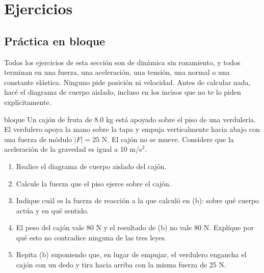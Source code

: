 \documentclass[11pt,openany]{book}
\begin{document}
\section{Ejercicios}

\subsection{Práctica en bloque}

Todos los ejercicios de esta sección son de dinámica sin rozamiento, y todos terminan en una fuerza, una aceleración, una tensión, una normal o una constante elástica. Ninguno pide posición ni velocidad. Antes de calcular nada, hacé el diagrama de cuerpo aislado, incluso en los incisos que no te lo piden explícitamente.

\begin{ejercicio}{bloque}
Un cajón de fruta de 8.0 kg está apoyado sobre el piso de una verdulería. El verdulero apoya la mano sobre la tapa y empuja verticalmente hacia abajo con una fuerza de módulo $|F| = 25$ N. El cajón no se mueve. Considere que la aceleración de la gravedad es igual a 10 m/s$^2$.
\begin{enumerate}[label=(\alph*), leftmargin=1.7em, itemsep=1pt, topsep=3pt]
  \item Realice el diagrama de cuerpo aislado del cajón.
  \item Calcule la fuerza que el piso ejerce sobre el cajón.
  \item Indique cuál es la fuerza de reacción a la que calculó en (b): sobre qué cuerpo actúa y en qué sentido.
  \item El peso del cajón vale 80 N y el resultado de (b) no vale 80 N. Explique por qué esto no contradice ninguna de las tres leyes.
  \item Repita (b) suponiendo que, en lugar de empujar, el verdulero engancha el cajón con un dedo y tira hacia arriba con la misma fuerza de 25 N.
\end{enumerate}
\end{ejercicio}
\end{document}
